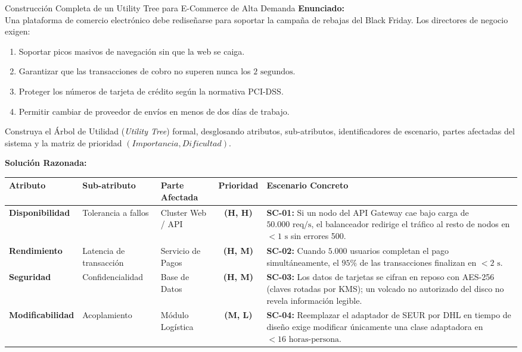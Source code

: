 \begin{ejercicioresuelto}{Construcción Completa de un Utility Tree para E-Commerce de Alta Demanda}
\textbf{Enunciado:}\\
Una plataforma de comercio electrónico debe rediseñarse para soportar la campaña de rebajas del Black Friday. Los directores de negocio exigen:
\begin{enumerate}
  \item Soportar picos masivos de navegación sin que la web se caiga.
  \item Garantizar que las transacciones de cobro no superen nunca los $2\text{ segundos}$.
  \item Proteger los números de tarjeta de crédito según la normativa PCI-DSS.
  \item Permitir cambiar de proveedor de envíos en menos de dos días de trabajo.
\end{enumerate}
Construya el Árbol de Utilidad (\emph{Utility Tree}) formal, desglosando atributos, sub-atributos, identificadores de escenario, partes afectadas del sistema y la matriz de prioridad $(Importancia, Dificultad)$.

\vspace{0.5em}
\textbf{Solución Razonada:}

\vspace{0.5em}
\begin{center}
\small
\begin{tabularx}{\linewidth}{l p{2.8cm} p{2.8cm} c X}
\toprule
\textbf{Atributo} & \textbf{Sub-atributo} & \textbf{Parte Afectada} & \textbf{Prioridad} & \textbf{Escenario Concreto} \\
\midrule
\textbf{Disponibilidad} & Tolerancia a fallos & Cluster Web / API & \textbf{(H, H)} & \textbf{SC-01:} Si un nodo del API Gateway cae bajo carga de $50.000\text{ req/s}$, el balanceador redirige el tráfico al resto de nodos en $<1\text{ s}$ sin errores 500. \\
\addlinespace
\textbf{Rendimiento} & Latencia de transacción & Servicio de Pagos & \textbf{(H, M)} & \textbf{SC-02:} Cuando $5.000$ usuarios completan el pago simultáneamente, el $95\%$ de las transacciones finalizan en $<2\text{ s}$. \\
\addlinespace
\textbf{Seguridad} & Confidencialidad & Base de Datos & \textbf{(H, M)} & \textbf{SC-03:} Los datos de tarjetas se cifran en reposo con AES-256 (claves rotadas por KMS); un volcado no autorizado del disco no revela información legible. \\
\addlinespace
\textbf{Modificabilidad} & Acoplamiento & Módulo Logística & \textbf{(M, L)} & \textbf{SC-04:} Reemplazar el adaptador de SEUR por DHL en tiempo de diseño exige modificar únicamente una clase adaptadora en $<16\text{ horas-persona}$. \\
\bottomrule
\end{tabularx}
\end{center}
\end{ejercicioresuelto}

